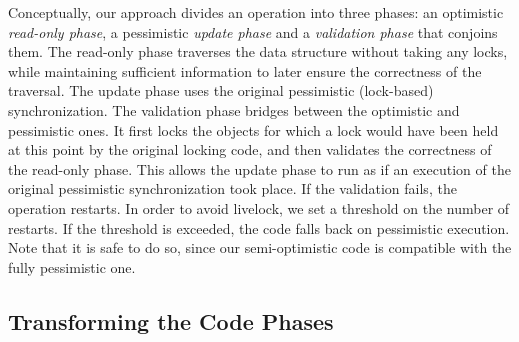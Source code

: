 Conceptually, our approach divides an operation into three phases: an optimistic \emph{read-only phase},
a pessimistic \emph{update phase} and a \emph{validation phase} that conjoins them.
The read-only phase traverses the data structure without taking any locks, while maintaining sufficient information to later ensure the correctness of the traversal.
The update phase uses the original pessimistic (lock-based) synchronization.
The validation phase bridges between the optimistic and pessimistic ones.
It first locks the objects for which a lock would have been held at this point by
the original locking code, and then validates the correctness
of the read-only phase. This allows the
update phase to run as if an execution of the original pessimistic synchronization
took place. If the validation fails, the operation
restarts. In order to avoid livelock, we set a threshold on the number of restarts.
If the threshold is exceeded, the code falls back on pessimistic execution.
Note that it is safe to do so, since our semi-optimistic code is compatible
with the fully pessimistic one.


\subsection{Transforming the Code Phases}\label{ssec:transformation}

